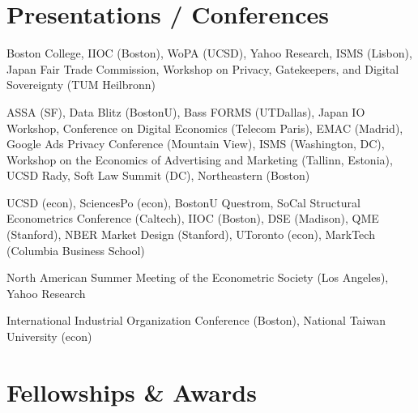 \documentclass[letterpaper]{article}
\begin{document}



\section*{Presentations / Conferences}

\begin{description}[font=\mdseries]
\item[2026]
  Boston College, IIOC (Boston), WoPA (UCSD), Yahoo Research, ISMS (Lisbon), Japan Fair Trade Commission, Workshop on Privacy, Gatekeepers, and Digital Sovereignty (TUM Heilbronn)
\item[2025]
  ASSA (SF), Data Blitz (BostonU), Bass FORMS (UTDallas), Japan IO Workshop, Conference on Digital Economics (Telecom Paris), EMAC (Madrid), Google Ads Privacy Conference (Mountain View), ISMS (Washington, DC), Workshop on the Economics of Advertising and Marketing (Tallinn, Estonia), UCSD Rady, Soft Law Summit (DC), Northeastern (Boston)
\item[2024]
  UCSD (econ), SciencesPo (econ), BostonU Questrom, SoCal Structural Econometrics Conference (Caltech), IIOC (Boston), DSE (Madison), QME (Stanford), NBER Market Design (Stanford), UToronto (econ), MarkTech (Columbia Business School)
\item[2023]
  North American Summer Meeting of the Econometric Society (Los Angeles), Yahoo Research
\item[2022]
  International Industrial Organization Conference (Boston), National Taiwan University (econ)
\end{description}

\section*{Fellowships \& Awards}
\end{document}
